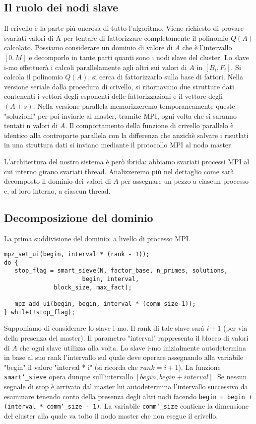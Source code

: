 \subsection{Il ruolo dei nodi slave}
Il crivello è la parte più onerosa di tutto l'algoritmo. Viene
richiesto di provare svariati valori di A per tentare di fattorizzare
completamente il polinomio $Q(A)$ calcolato. Possiamo considerare un
dominio di valore di $A$ che è l'intervallo $[0, M]$ e decomporlo in
tante parti quanti sono i nodi slave del cluster. Lo slave i-mo
effettuerà i calcoli parallelamente agli altri sui valori di $A$ in $[B_i, F_i]$.
Si calcola il polinomio $Q(A)$, si cerca di fattorizzarlo sulla base di
fattori. Nella versione seriale dalla procedura di crivello, si
ritornavano due strutture dati contenenti i vettori degli esponenti
delle fattorizzazioni e il vettore degli $(A + s)$. Nella versione
parallela memorizzeremo temporaneamente queste "soluzioni" per poi
inviarle al master, tramite MPI, ogni volta che si saranno tentati n valori
di $A$. Il comportamento della funzione di crivello parallelo è identico
alla controparte parallela con la differenza che anzichè salvare i risutlati
in una struttura dati si inviano mediante il protocollo MPI al nodo master.

L'architettura del nostro sistema è però ibrida: abbiamo svariati
processi MPI al cui interno girano svariati thread. Analizzeremo più nel
dettaglio come sarà decomposto il dominio dei valori di $A$ per
assegnare un pezzo a ciascun processo e, al loro interno, a ciascun
thread.
\subsection{Decomposizione del dominio}
La prima suddivisione del dominio: a livello di processo MPI.
\begin{lstlisting}
mpz_set_ui(begin, interval * (rank - 1));
do {
   stop_flag = smart_sieve(N, factor_base, n_primes, solutions,
                	  begin, interval,
		  	  block_size, max_fact);

   mpz_add_ui(begin, begin, interval * (comm_size-1));
} while(!stop_flag);
\end{lstlisting}
Supponiamo di considerare lo slave i-mo. Il rank di tale slave sarà
$i+1$ (per via della presenza del master). Il parametro "interval"
rappresenta il blocco di valori di $A$ che ogni slave utilizza alla
volta. Lo slave i-mo inizialmente autodetermina in base al suo
rank l'intervallo sul quale deve operare assegnando alla variabile
"begin" il valore "interval * i" (si ricorda che $rank = i + 1$).
La funzione \texttt{smart\char`_sieve} opera dunque sull'intervallo $[begin, begin +
  interval]$. Se nessun segnale di stop è arrivato dal master lui
autodetermina l'intervallo successivo da esaminare tenendo conto della
presenza degli altri nodi facendo \texttt{begin = begin + (interval *
comm\char`_size - 1)}. La variabile \texttt{comm\char`_size} contiene la dimensione del
cluster alla quale va tolto il nodo master che non esegue il crivello.

